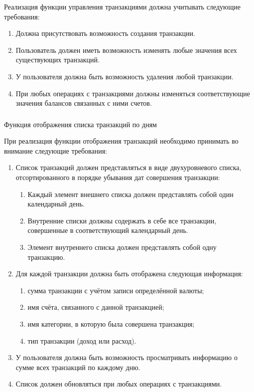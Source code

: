 Реализация функции управления транзакциями должна учитывать следующие требования:

\begin{enumerate}
    \item Должна присутствовать возможность создания транзакции.
    \item Пользователь должен иметь возможность изменять любые значения всех существующих транзакций.
    \item У пользователя должна быть возможность удаления любой транзакции.
    \item При любых операциях с транзакциями должны изменяться соответствующие значения балансов связанных с ними счетов.
\end{enumerate}

\subsubsection{} Функция отображения списка транзакций по дням
\label{sec:domain:specification:transactions_list}

При реализация функции отображения транзакций необходимо принимать во внимание следующие требования:

\begin{enumerate}
    \item Список транзакций должен представляться в виде двухуровневого списка, отсортированного в порядке убывания дат совершения транзакции:
    \begin{enumerate}
        \item Каждый элемент внешнего списка должен представлять собой один календарный день.
        \item Внутренние списки должны содержать в себе все транзакции, совершенные в соответствующий календарный день.
        \item Элемент внутреннего списка должен представлять собой одну транзакцию.
    \end{enumerate}
    \item Для каждой транзакции должна быть отображена следующая информация:
    \begin{enumerate}
        \item сумма транзакции с учётом записи определённой валюты;
        \item имя счёта, связанного с данной транзакцией;
        \item имя категории, в которую была совершена транзакция;
        \item тип транзакции (доход или расход).
    \end{enumerate}
    \item У пользователя должна быть возможность просматривать информацию о сумме всех транзакций по каждому дню.
    \item Список должен обновляться при любых операциях с транзакциями.
\end{enumerate}
